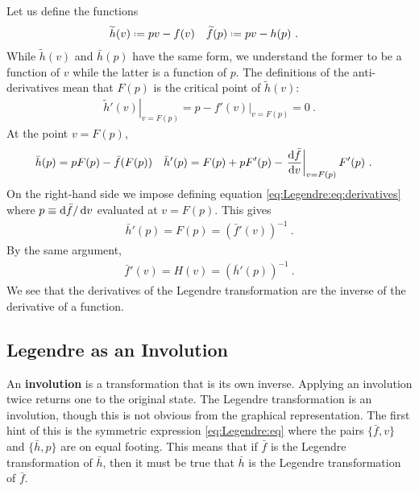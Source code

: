 Let us define the functions
\begin{align}
    \tilde h(v) &\defeq p v - f(v)
    &
    \tilde f(p) &\defeq p v - h(p) \ .
\end{align}
While $\tilde h(v)$ and $\bar h(p)$ have the same form, we understand the former to be a function of $v$ while the latter is a function of $p$.  %
% 
The definitions of the anti-derivatives mean that $F(p)$ is the critical point of $\tilde h(v)$:
\begin{align}
    \left.\tilde h'(v)\right|_{v=F(p)} = p - \left.f'(v)\right|_{v=F(p)} = 0 \ .
\end{align}
At the point $v=F(p)$,
\begin{align}
    \bar h(p) &= p F(p) - \bar f(F(p))
    &
    \bar h'(p) &= F(p) + p F'(p) 
    - \left.\frac{\operatorname{d}\mkern-3mu^{}\mkern-1mu{\bar f}}{\operatorname{d}\mkern-3mu^{}\mkern-1mu{v}}\right|_{v=F(p)}
        F'(p) \ .
\end{align}
On the right-hand side we impose defining equation \eqref{eq:Legendre:eq:derivatives} where $p\equiv \operatorname{d}\mkern-3mu^{}\mkern-1mu{\bar f}/\operatorname{d}\mkern-3mu^{}\mkern-1mu{v}$ evaluated at $v=F(p)$. This gives
\begin{align}
    \bar h'(p) = F(p) = \left(\bar f'(v)\right)^{-1} \ .
\end{align}
By the same argument,
\begin{align}
    \bar f'(v) = H(v) = \left(\bar h'(p)\right)^{-1} \ .
\end{align}
We see that the derivatives of the Legendre transformation are the inverse of the derivative of a function.



\subsection{Legendre as an Involution}

An \textbf{involution} is a transformation that is its own inverse. Applying an involution twice returns one to the original state. The Legendre transformation is an involution, though this is not obvious from the graphical representation. The first hint of this is the symmetric expression \eqref{eq:Legendre:eq} where the pairs $\{\bar f, v\}$ and $\{\bar h, p\}$ are on equal footing. This means that if $\bar f$ is the Legendre transformation of $\bar h$, then it must be true that $\bar h$ is the Legendre transformation of $\bar f$. 

